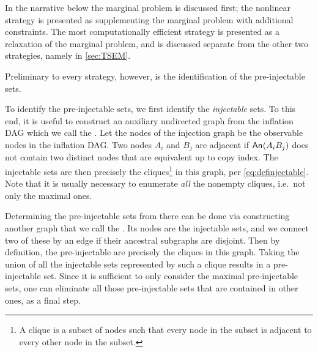 In the narrative below the marginal problem is discussed first; the nonlinear strategy is presented as supplementing the marginal problem with additional constraints. The most computationally efficient strategy is presented as a relaxation of the marginal problem, and is discussed separate from the other two strategies, namely in \cref{sec:TSEM}.

Preliminary to every strategy, however, is the identification of the pre-injectable sets.


\label{step:findpreinjectable}

To identify the pre-injectable sets, we first identify the \emph{injectable} sets. To this end, it is useful to construct an auxiliary undirected graph from the inflation DAG which we call the . Let the nodes of the injection graph be the observable nodes in the inflation DAG. Two nodes $A_i$ and $B_j$ are adjacent if  ${\mathsf{An}_{}}\lparen A_i B_j\rparen$ does not contain two distinct nodes that are equivalent up to copy index. The injectable sets are then precisely the cliques\footnote{A clique is a subset of nodes such that every node in the subset is adjacent to every other node in the subset.} in this graph, per \cref{eq:definjectable}. Note that it is usually necessary to enumerate \emph{all} the nonempty cliques, i.e.~not only the maximal ones.

Determining the pre-injectable sets from there can be done via constructing another graph that we call the . Its nodes are the injectable sets, and we connect two of these by an edge if their ancestral subgraphs are disjoint. Then by definition, the pre-injectable are precisely the cliques in this graph. Taking the union of all the injectable sets represented by such a clique results in a pre-injectable set. Since it is sufficient to only consider the maximal pre-injectable sets, one can eliminate all those pre-injectable sets that are contained in other ones, as a final step.


